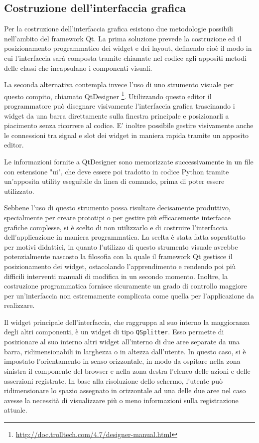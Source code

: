 \subsection{Costruzione dell'interfaccia grafica}

Per la costruzione dell'interfaccia grafica esistono due metodologie possibili nell'ambito del framework Qt. La prima soluzione prevede la costruzione ed il posizionamento programmatico dei widget e dei layout, definendo cioè il modo in cui l'interfaccia sarà composta tramite chiamate nel codice agli appositi metodi delle classi che incapsulano i componenti visuali.

La seconda alternativa contempla invece l'uso di uno strumento visuale per questo compito, chiamato QtDesigner \footnote{\url{http://doc.trolltech.com/4.7/designer-manual.html}}. Utilizzando questo editor il programmatore può disegnare visivamente l'interfaccia grafica trascinando i widget da una barra direttamente sulla finestra principale e posizionarli a piacimento senza ricorrere al codice. E' inoltre possibile gestire visivamente anche le connessioni tra signal e slot dei widget in maniera rapida tramite un apposito editor. 

Le informazioni fornite a QtDesigner sono memorizzate successivamente in un file con estensione "ui", che deve essere poi tradotto in codice Python tramite un'apposita utility eseguibile da linea di comando, prima di poter essere utilizzato.

Sebbene l'uso di questo strumento possa risultare decisamente produttivo, specialmente per creare prototipi o per gestire più efficacemente interfacce grafiche complesse, si è scelto di non utilizzarlo e di costruire l'interfaccia dell'applicazione in maniera programmatica. La scelta è stata fatta soprattutto per motivi didattici, in quanto l'utilizzo di questo strumento visuale avrebbe potenzialmente nascosto la filosofia con la quale il framework Qt gestisce il posizionamento dei widget, ostacolando l'apprendimento e rendendo poi più difficili interventi manuali di modifica in un secondo momento. Inoltre, la costruzione programmatica fornisce sicuramente un grado di controllo maggiore per un'interfaccia non estremamente complicata come quella per l'applicazione da realizzare.

Il widget principale dell'interfaccia, che raggruppa al suo interno la maggioranza degli altri componenti, è un widget di tipo \verb|QSplitter|. Esso permette di posizionare al suo interno altri widget all'interno di due aree separate da una barra, ridimensionabili in larghezza o in altezza dall'utente. In questo caso, si è impostato l'orientamento in senso orizzontale, in modo da ospitare nella zona sinistra il componente del browser e nella zona destra l'elenco delle azioni e delle asserzioni registrate. In base alla risoluzione dello schermo, l'utente può ridimensionare lo spazio assegnato in orizzontale ad una delle due aree nel caso avesse la necessità di visualizzare più o meno informazioni sulla registrazione attuale.

